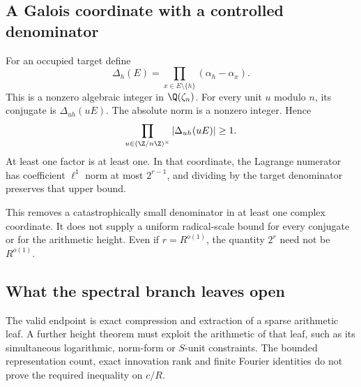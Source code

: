\subsection{A Galois coordinate with a controlled denominator}
For an occupied target define
\[
 \Delta_h(E)=\prod_{x\in E\setminus\{h\}}(\alpha_h-\alpha_x).
\]
This is a nonzero algebraic integer in $\Q(\zeta_n)$. For every unit $u$ modulo $n$, its conjugate is $\Delta_{uh}(uE)$. The absolute norm is a nonzero integer. Hence
\[
 \prod_{u\in(\Z/n\Z)^\times}|\Delta_{uh}(uE)|\ge1.
\]
At least one factor is at least one. In that coordinate, the Lagrange numerator has coefficient $\ell^1$ norm at most $2^{r-1}$, and dividing by the target denominator preserves that upper bound.

This removes a catastrophically small denominator in at least one complex coordinate. It does not supply a uniform radical-scale bound for every conjugate or for the arithmetic height. Even if $r=R^{o(1)}$, the quantity $2^r$ need not be $R^{o(1)}$.

\subsection{What the spectral branch leaves open}
The valid endpoint is exact compression and extraction of a sparse arithmetic leaf. A further height theorem must exploit the arithmetic of that leaf, such as its simultaneous logarithmic, norm-form or $S$-unit constraints. The bounded representation count, exact innovation rank and finite Fourier identities do not prove the required inequality on $c/R$.

